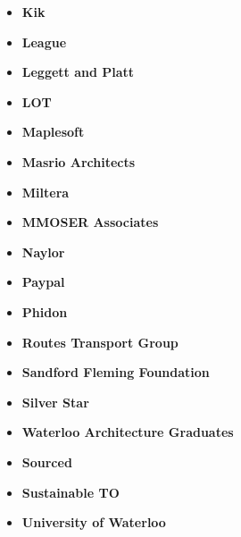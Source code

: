 \documentclass[main.tex]{subfiles}
\begin{document}
\begin{flushleft}
\begin{multicols}{3}
\begin{itemize}[label={},noitemsep]
    \item \textbf{Kik}
    \item \textbf{League}
    \item \textbf{Leggett and Platt}
    \end{itemize}
\end{multicols}

\begin{multicols}{3}
\begin{itemize}[label={},noitemsep]
    \item \textbf{LOT}
    \item \textbf{Maplesoft}
    \item \textbf{Masrio Architects}
    \end{itemize}
\end{multicols}

\begin{multicols}{3}
\begin{itemize}[label={},noitemsep]
    \item \textbf{Miltera}
    \item \textbf{MMOSER Associates}
    \item \textbf{Naylor}
    \end{itemize}
\end{multicols}

\begin{multicols}{3}
\begin{itemize}[label={},noitemsep]
    \item \textbf{Paypal}
    \item \textbf{Phidon}
    \item \textbf{Routes Transport Group}
    \end{itemize}
\end{multicols}

\begin{multicols}{3}
\begin{itemize}[label={},noitemsep]
    \item \textbf{Sandford Fleming Foundation}
    \item \textbf{Silver Star}
    \item \textbf{Waterloo Architecture Graduates}
    \end{itemize}
\end{multicols}

\begin{multicols}{3}
\begin{itemize}[label={},noitemsep]
    \item \textbf{Sourced}
    \item \textbf{Sustainable TO}
    \item \textbf{University of Waterloo}
    \end{itemize}
\end{multicols}


\end{flushleft}
\end{document}
